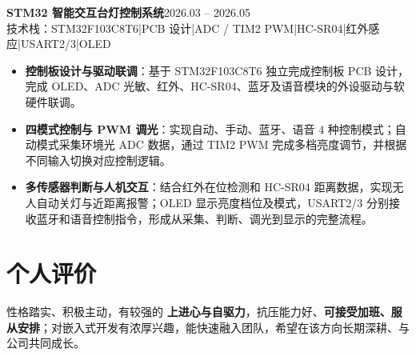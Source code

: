\documentclass[10pt,a4paper]{article}
\newcommand{\projectblock}[3]{%
    {\bfseries\color{darktext}#1}\hfill{\color{graytext}#2}\\%
    {\small\color{graytext}#3}%
    \vspace{0.15em}%
}
\begin{document}
\vspace{0.15em}

\projectblock{STM32 智能交互台灯控制系统}{2026.03 -- 2026.05}{技术栈：STM32F103C8T6\hspace{0.3em}|\hspace{0.3em}PCB 设计\hspace{0.3em}|\hspace{0.3em}ADC / TIM2 PWM\hspace{0.3em}|\hspace{0.3em}HC-SR04\hspace{0.3em}|\hspace{0.3em}红外感应\hspace{0.3em}|\hspace{0.3em}USART2/3\hspace{0.3em}|\hspace{0.3em}OLED}

\begin{itemize}[leftmargin=1.5em, itemsep=1pt, parsep=0pt, topsep=2pt]
    \item \textbf{控制板设计与驱动联调}：基于 STM32F103C8T6 独立完成控制板 PCB 设计，完成 OLED、ADC 光敏、红外、HC-SR04、蓝牙及语音模块的外设驱动与软硬件联调。
    \item \textbf{四模式控制与 PWM 调光}：实现自动、手动、蓝牙、语音 4 种控制模式；自动模式采集环境光 ADC 数据，通过 TIM2 PWM 完成多档亮度调节，并根据不同输入切换对应控制逻辑。
    \item \textbf{多传感器判断与人机交互}：结合红外在位检测和 HC-SR04 距离数据，实现无人自动关灯与近距离报警；OLED 显示亮度档位及模式，USART2/3 分别接收蓝牙和语音控制指令，形成从采集、判断、调光到显示的完整流程。
\end{itemize}

\vspace{0.15em}

\section{\faUser\hspace{0.4em}个人评价}

性格踏实、积极主动，有较强的 \textbf{上进心与自驱力}，抗压能力好、\textbf{可接受加班、服从安排}；对嵌入式开发有浓厚兴趣，能快速融入团队，希望在该方向长期深耕、与公司共同成长。
\end{document}
